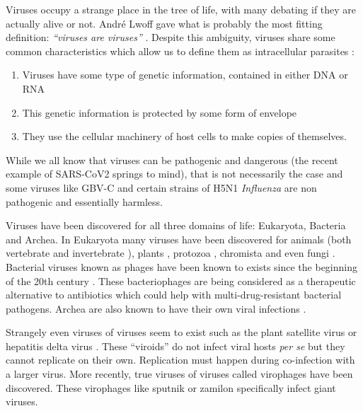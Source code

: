 \documentclass[
  11pt,
  twoside,
  BCOR=10mm,
  listof=totoc]{scrbook}
\providecommand{\tightlist}{%
  \setlength{\itemsep}{0pt}\setlength{\parskip}{0pt}}
\begin{document}
Viruses occupy a strange place in the tree of life, with many debating if they are actually alive or not. André Lwoff gave what is probably the most fitting definition: \emph{``viruses are viruses''} \autocite{lwoffConceptVirus1957}. Despite this ambiguity, viruses share some common characteristics which allow us to define them as intracellular parasites \autocite{minorViruses2014}:

\begin{enumerate}
\def\labelenumi{\arabic{enumi}.}
\tightlist
\item
  Viruses have some type of genetic information, contained in either DNA or RNA
\item
  This genetic information is protected by some form of envelope
\item
  They use the cellular machinery of host cells to make copies of themselves.
\end{enumerate}

While we all know that viruses can be pathogenic and dangerous (the recent example of SARS-CoV2 springs to mind), that is not necessarily the case and some viruses like GBV-C \autocite{stapletonGBVirusesReview2011} and certain strains of H5N1 \emph{Influenza} \autocite{yamamotoCharacterizationNonpathogenicH5N12011} are non pathogenic and essentially harmless.

Viruses have been discovered for all three domains of life: Eukaryota, Bacteria and Archea. In Eukaryota many viruses have been discovered for animals (both vertebrate \autocite{shiEvolutionaryHistoryVertebrate2018} and invertebrate \autocite{adamsAtlasInvertebrateViruses2017}), plants \autocite{lefeuvreEvolutionEcologyPlant2019}, protozoa \autocite{wangVirusesParasiticProtozoa1991}, chromista \autocite{ferminVirusesProkaryotesProtozoa2018} and even fungi \autocite{sutelaVirusesFungiOomycetes2019}. Bacterial viruses known as phages have been known to exists since the beginning of the 20th century \autocite{twortINVESTIGATIONNATUREULTRAMICROSCOPIC1915,delbrockBacterialVirusesBacteriophages1946}. These bacteriophages are being considered as a therapeutic alternative to antibiotics \autocite{clarkBacterialVirusesHuman2004,vankan-davelaarUsingVirusesNanomedicines2014} which could help with multi-drug-resistant bacterial pathogens. Archea are also known to have their own viral infections \autocite{prangishviliVirusesArchaea2016,prangishviliVirusesArchaeaUnifying2006}.

Strangely even viruses of viruses seem to exist such as the plant satellite virus \autocite{franckiPlantVirusSatellites,xuPlantVirusSatellites2011} or hepatitis delta virus \autocite{laiMolecularBiologyHepatitis1995,hughesHepatitisDeltaVirus2011}. These ``viroids'' do not infect viral hosts \emph{per se} but they cannot replicate on their own. Replication must happen during co-infection with a larger virus. More recently, true viruses of viruses called virophages have been discovered. These virophages like sputnik \autocite{desnuesChapterSputnikVirophage2012} or zamilon \autocite{gaiaZamilonNovelVirophage2014} specifically infect giant viruses.
\end{document}
